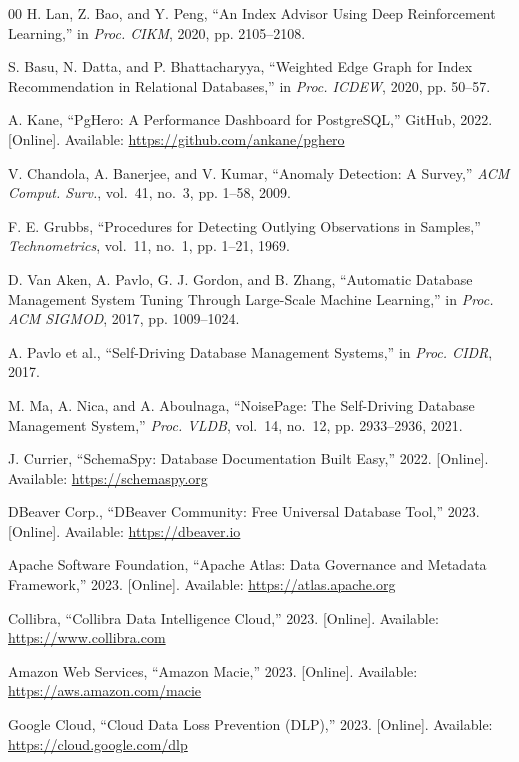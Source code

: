 \documentclass[12pt,a4paper]{report}
\begin{document}
\begin{thebibliography}{00}
H. Lan, Z. Bao, and Y. Peng, ``An Index Advisor Using Deep Reinforcement Learning,'' in \textit{Proc. CIKM}, 2020, pp. 2105--2108.

S. Basu, N. Datta, and P. Bhattacharyya, ``Weighted Edge Graph for Index Recommendation in Relational Databases,'' in \textit{Proc. ICDEW}, 2020, pp. 50--57.

A. Kane, ``PgHero: A Performance Dashboard for PostgreSQL,'' GitHub, 2022. [Online]. Available: \url{https://github.com/ankane/pghero}

V. Chandola, A. Banerjee, and V. Kumar, ``Anomaly Detection: A Survey,'' \textit{ACM Comput. Surv.}, vol.~41, no.~3, pp. 1--58, 2009.

F. E. Grubbs, ``Procedures for Detecting Outlying Observations in Samples,'' \textit{Technometrics}, vol.~11, no.~1, pp. 1--21, 1969.

D. Van Aken, A. Pavlo, G. J. Gordon, and B. Zhang, ``Automatic Database Management System Tuning Through Large-Scale Machine Learning,'' in \textit{Proc. ACM SIGMOD}, 2017, pp. 1009--1024.

A. Pavlo et al., ``Self-Driving Database Management Systems,'' in \textit{Proc. CIDR}, 2017.

M. Ma, A. Nica, and A. Aboulnaga, ``NoisePage: The Self-Driving Database Management System,'' \textit{Proc. VLDB}, vol.~14, no.~12, pp. 2933--2936, 2021.

J. Currier, ``SchemaSpy: Database Documentation Built Easy,'' 2022. [Online]. Available: \url{https://schemaspy.org}

DBeaver Corp., ``DBeaver Community: Free Universal Database Tool,'' 2023. [Online]. Available: \url{https://dbeaver.io}

Apache Software Foundation, ``Apache Atlas: Data Governance and Metadata Framework,'' 2023. [Online]. Available: \url{https://atlas.apache.org}

Collibra, ``Collibra Data Intelligence Cloud,'' 2023. [Online]. Available: \url{https://www.collibra.com}

Amazon Web Services, ``Amazon Macie,'' 2023. [Online]. Available: \url{https://aws.amazon.com/macie}

Google Cloud, ``Cloud Data Loss Prevention (DLP),'' 2023. [Online]. Available: \url{https://cloud.google.com/dlp}


\end{thebibliography}
\end{document}
